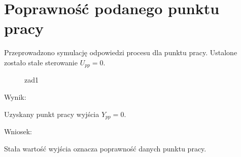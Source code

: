 \section{Poprawność podanego punktu pracy}
\label{projekt:zad1}
Przeprowadzono symulację odpowiedzi procesu dla punktu pracy. 
Ustalone zostało stałe sterowanie $U_{pp} = 0$.

\begin{figure}[H] 
    \centering
    
    \caption{zad1}
    \label{projekt:zad1:figure:zad1}
\end{figure}


Wynik: 

\indent Uzyskany punkt pracy wyjścia $Y_{pp}=0$.

Wniosek: 

\indent Stała wartość wyjścia oznacza poprawność danych punktu pracy.

\newpage
